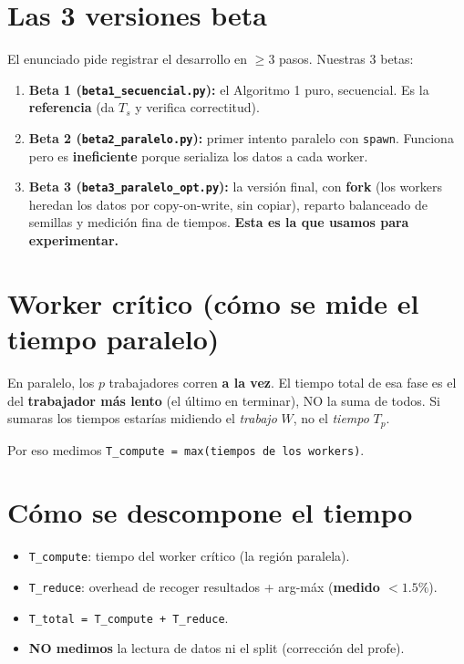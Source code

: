 \documentclass[11pt,a4paper]{article}
\begin{document}
\section{Las 3 versiones beta}

El enunciado pide registrar el desarrollo en $\geq 3$ pasos. Nuestras 3 betas:

\begin{enumerate}
  \item \textbf{Beta 1 (\texttt{beta1\_secuencial.py}):} el Algoritmo 1 puro,
        secuencial. Es la \textbf{referencia} (da $T_s$ y verifica correctitud).
  \item \textbf{Beta 2 (\texttt{beta2\_paralelo.py}):} primer intento paralelo
        con \texttt{spawn}. Funciona pero es \textbf{ineficiente} porque
        serializa los datos a cada worker.
  \item \textbf{Beta 3 (\texttt{beta3\_paralelo\_opt.py}):} la versión final,
        con \textbf{fork} (los workers heredan los datos por copy-on-write, sin
        copiar), reparto balanceado de semillas y medición fina de tiempos.
        \textbf{Esta es la que usamos para experimentar.}
\end{enumerate}

\section{Worker crítico (cómo se mide el tiempo paralelo)}

\begin{importante}[title=\textbf{El tiempo paralelo NO es la suma}]
En paralelo, los $p$ trabajadores corren \textbf{a la vez}. El tiempo total de
esa fase es el del \textbf{trabajador más lento} (el último en terminar), NO la
suma de todos. Si sumaras los tiempos estarías midiendo el \emph{trabajo} $W$, no
el \emph{tiempo} $T_p$.

Por eso medimos \texttt{T\_compute = max(tiempos de los workers)}.
\end{importante}

\section{Cómo se descompone el tiempo}

\begin{itemize}
  \item \texttt{T\_compute}: tiempo del worker crítico (la región paralela).
  \item \texttt{T\_reduce}: overhead de recoger resultados + arg-máx
        (\textbf{medido $<1.5\%$}).
  \item \texttt{T\_total = T\_compute + T\_reduce}.
  \item \textbf{NO medimos} la lectura de datos ni el split (corrección del profe).
\end{itemize}
\end{document}
